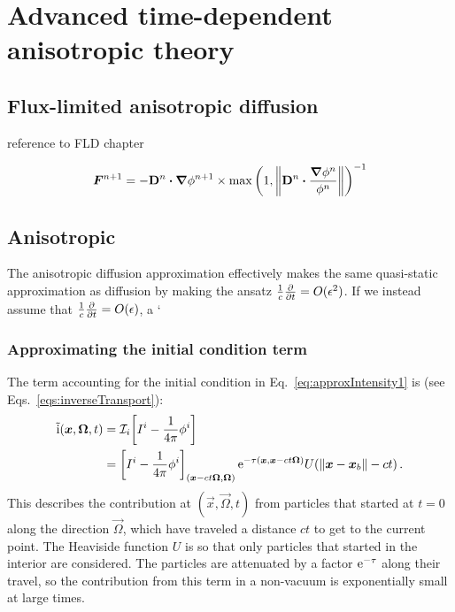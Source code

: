 
\chapter{Advanced time-dependent anisotropic theory}

\section{Flux-limited anisotropic diffusion}

reference to FLD chapter

\begin{equation*}
  \bm{F}^{n+1} = -\mathbf{D}^{n}\bm{\cdot} \bm{\nabla} \phi^{n+1} \times 
  \max\left( 1, \left\| \mathbf{D}^{n}\bm{\cdot} \frac{\bm{\nabla} \phi^{n}}{\phi^{n}} \right\|
  \right)^{-1}
\end{equation*}


\section{Anisotropic \Pone}
The anisotropic diffusion approximation effectively makes the same quasi-static
approximation as diffusion by making the ansatz
$\frac1c\frac{\partial }{\partial t}=O(\epsilon^2)$. If we instead assume that
$\frac1c\frac{\partial }{\partial t}=O(\epsilon)$, a `

\subsection{Approximating the initial condition term}\label{sec:derPoneIc}
The term accounting for the initial condition in
Eq.~\eqref{eq:approxIntensity1} is (see Eqs.~\eqref{eqs:inverseTransport}):
\begin{align*}
  \mathrm{ \tilde i }(\bm{x}, \bm{\Omega}, t) &=
    \mathcal{I}_{i}\!\left[I^i - \frac1{4\pi} \phi^i\right]
  \\
  &= \left[ I^i - \frac1{4\pi} \phi^i \right]_{( \bm{x} - ct
  \bm{\Omega}, \bm{\Omega})}
    \mathop{}\!\mathrm{e}^{ -\tau(\bm{x}, \bm{x} - ct \bm{\Omega})}
    U( \left\| \bm{x} - \bm{x}_b \right\| - ct)\,.
\end{align*}
This describes the contribution at $(\vec{x}, \vec{\Omega}, t)$ from particles
that started at $t=0$ along the direction $\vec{\Omega}$, which have
traveled a distance $ct$ to get to the current point. The Heaviside function
$U$ is so that only particles that started in the interior are considered. The
particles are attenuated by a factor $\mathop{}\!\mathrm{e}^{ -\tau}$ along their travel, so
the contribution from this term in a non-vacuum is exponentially small at large
times.

